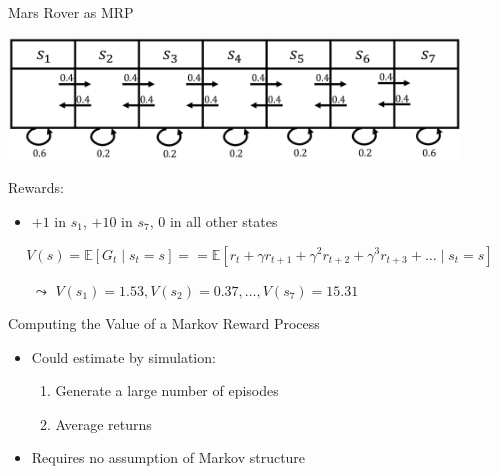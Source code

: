 \documentclass[aspectratio=169]{../latex_main/tntbeamer}  %
\begin{document}
\begin{frame}[c]{Mars Rover as MRP}
	
	\begin{center}
		\includegraphics[width=0.9\textwidth]{images/mars_rover_markov_process_2.png}
	\end{center}
	
	Rewards:
	\begin{itemize}
		\item $+1$ in $s_1$, $+10$ in $s_7$, $0$ in all other states
	\end{itemize}

$$ V(s)  = \mathbb{E}[G_t \mid s_t=s] == \mathbb{E}[r_t + \gamma r_{t+1} + \gamma^2 r_{t+2} + \gamma^3 r_{t+3} + \ldots \mid s_t = s]$$

	\begin{itemize}
		\item[$\leadsto$] $V(s_1) = 1.53, V(s_2) = 0.37, \ldots, V(s_7) = 15.31$
	\end{itemize}
	
\end{frame}
\begin{frame}[c]{Computing the Value of a Markov Reward Process}
	
	\begin{itemize}
		\item Could estimate by simulation:
		\begin{enumerate}
			\item Generate a large number of episodes
			\item Average returns
		\end{enumerate}
		\item Requires no assumption of Markov structure
	\end{itemize}
	
\end{frame}
\end{document}
